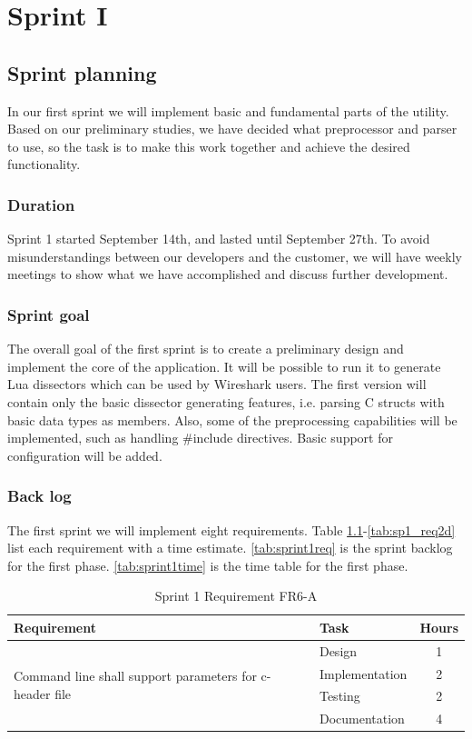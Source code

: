 \chapter{Sprint I}


\section{Sprint planning}
In our first sprint we will implement basic and fundamental parts of the
utility. Based on our preliminary studies, we have decided what preprocessor
and parser to use, so the task is to make this work together and achieve the
desired functionality.  

\subsection{Duration}
Sprint 1 started September 14th, and lasted until September 27th. To avoid
misunderstandings between our developers and the customer, we will have weekly
meetings to show what we have accomplished and discuss further development. 

\subsection{Sprint goal}
The overall goal of the first sprint is to create a preliminary design and
implement the core of the application. It will be possible to run it to
generate Lua dissectors which can be used by Wireshark users. The first
version will contain only the basic dissector generating features, i.e.
parsing C structs with basic data types as members. Also, some of the
preprocessing capabilities will be implemented, such as handling \#include
directives. Basic support for configuration will be added.

\subsection{Back log}
The first sprint we will implement eight requirements. Table
\ref{tab:sp1_req7a}-\ref{tab:sp1_req2d}  list each requirement with a time
estimate. \autoref{tab:sprint1req} is the sprint backlog for the first phase.
\autoref{tab:sprint1time} is the time table for the first phase.

\begin{table}[!ht] \small \center
\caption{Sprint 1 Requirement FR6-A\label{tab:sp1_req7a}}
\begin{tabular}{l l c}
	\toprule
	Requirement & Task & Hours \\
	\midrule
	\multirow{4}{5cm}{Command line shall support parameters for c-header file} & Design & 1 \\
	& Implementation & 2 \\
	& Testing & 2 \\
	& Documentation & 4 \\
	\bottomrule
\end{tabular}
\end{table}

